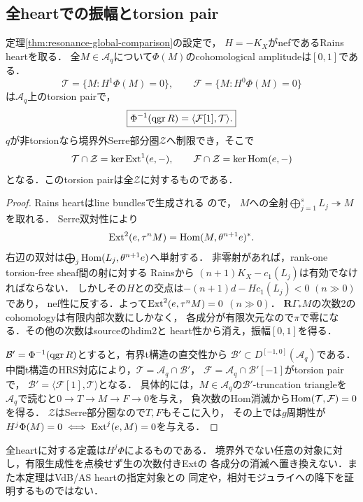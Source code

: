 \subsection{全heartでの振幅とtorsion pair}
\begin{theorem}
\label{thm:resonance-global-tilt}
定理\ref{thm:resonance-global-comparison}の設定で，
$H=-K_X$がnefであるRains heartを取る．
全$M\in\mathcal A_q$について$\Phi(M)$のcohomological amplitudeは$[0,1]$である．
\[
\mathcal T=\{M:H^1\Phi(M)=0\},\qquad
\mathcal F=\{M:H^0\Phi(M)=0\}
\]
は$\mathcal A_q$上のtorsion pairで，
\[
\boxed{\Phi^{-1}(\operatorname{qgr} R)=\langle\mathcal F[1],\mathcal T\rangle.}
\]
$q$が非torsionなら境界外Serre部分圏$\mathcal Z$へ制限でき，そこで
\[
\mathcal T\cap\mathcal Z=\ker\operatorname{Ext}^1(e,-),\qquad
\mathcal F\cap\mathcal Z=\ker\operatorname{Hom}(e,-)
\]
となる．このtorsion pairは全$\mathcal Z$に対するものである．
\end{theorem}
\begin{proof}
Rains heartはline bundlesで生成される
\cite[Theorem 9.10]{RainsBirational}ので，
$M$への全射$\bigoplus_{j=1}^sL_j\twoheadrightarrow M$を取れる．
Serre双対性により
\[
\operatorname{Ext}^2(e,\tau^nM)=\operatorname{Hom}(M,\theta^{n+1}e)^*.
\]
右辺の双対は$\bigoplus_j\operatorname{Hom}(L_j,\theta^{n+1}e)$へ単射する．
非零射があれば，rank-one torsion-free sheaf間の射に対する
Rains\cite[Corollary 10.12]{RainsBirational}から
$(n+1)K_X-c_1(L_j)$は有効でなければならない．
しかしその$H$との交点は$-(n+1)d-Hc_1(L_j)<0$ $(n\gg0)$であり，
nef性に反する．よって$\operatorname{Ext}^2(e,\tau^nM)=0$ $(n\gg0)$．
$\mathbf R\Gamma_*M$の次数2のcohomologyは有限内部次数にしかなく，
各成分が有限次元なので$\pi$で零になる．その他の次数はsourceのhdim2と
heart性から消え，振幅$[0,1]$を得る．

$\mathcal B'=\Phi^{-1}(\operatorname{qgr} R)$とすると，有界t構造の直交性から
$\mathcal B'\subset D^{[-1,0]}(\mathcal A_q)$である．
中間t構造のHRS対応により，$\mathcal T=\mathcal A_q\cap\mathcal B'$，
$\mathcal F=\mathcal A_q\cap\mathcal B'[-1]$がtorsion pairで，
$\mathcal B'=\langle\mathcal F[1],\mathcal T\rangle$となる．
具体的には，$M\in\mathcal A_q$の$\mathcal B'$-truncation triangleを
$\mathcal A_q$で読むと$0\to T\to M\to F\to0$を与え，
負次数のHom消滅から$\operatorname{Hom}(\mathcal T,\mathcal F)=0$を得る．
$\mathcal Z$はSerre部分圏なので$T,F$もそこに入り，
その上では$g$周期性が$H^j\Phi(M)=0\iff\operatorname{Ext}^j(e,M)=0$を与える．
\end{proof}
\begin{remark}
全heartに対する定義は$H^j\Phi$によるものである．
境界外でない任意の対象に対し，有限生成性を点検せず生の次数付きExtの
各成分の消滅へ置き換えない．また本定理はVdB/AS heartの指定対象との
同定や，相対モジュライへの降下を証明するものではない．
\end{remark}

